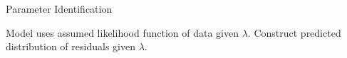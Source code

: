 \begin{block}{Parameter Identification}
\centering
            
        \begin{itemize}
             Model uses assumed likelihood function of data given $\lambda$.
             Construct predicted distribution of residuals given $\lambda$.
        \end{itemize}            



\end{block}


